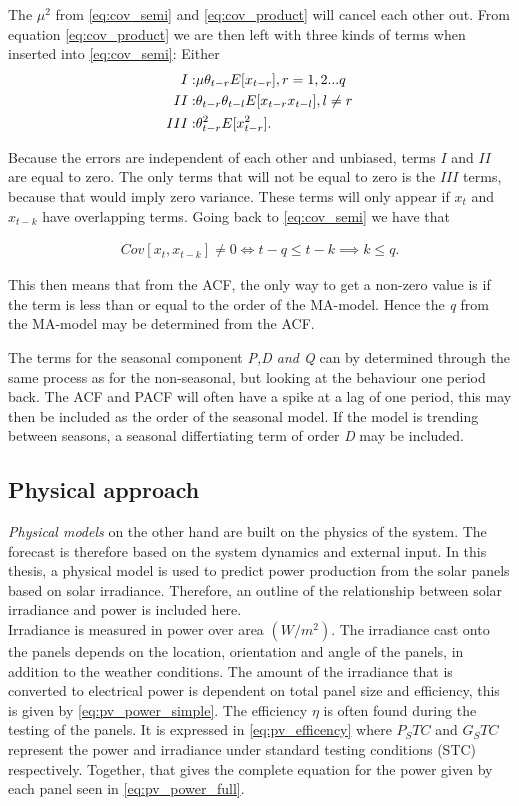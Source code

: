 The $\mu^2$ from \ref{eq:cov_semi} and \ref{eq:cov_product} will cancel each other out. From equation \ref{eq:cov_product} we are then left with three kinds of terms when inserted into \ref{eq:cov_semi}: Either 
\begin{align}
    I: & \mu \theta_{t-r}E[x_{t-r}], r=1,2...q\notag\\
    II:& \theta_{t-r}\theta_{t-l}E[x_{t-r}x_{t-l}], l\neq r\notag\\
    III:& \theta_{t-r}^2E[x_{t-r}^2].
\end{align}

Because the errors are independent of each other and unbiased, terms $I$ and $II$ are equal to zero. The only terms that will not be equal to zero is the $III$ terms, because that would imply zero variance. These terms will only appear if $x_t$ and $x_{t-k}$ have overlapping terms. Going back to \ref{eq:cov_semi} we have that

\begin{align}
    Cov[x_t,x_{t-k}] \neq 0 \iff t-q\leq t-k \implies k\leq q.
\end{align}

This then means that from the ACF, the only way to get a non-zero value is if the term is less than or equal to the order of the MA-model. Hence the \textit{q} from the MA-model may be determined from the ACF.

The terms for the seasonal component \textit{P,D and Q} can by determined through the same process as for the non-seasonal, but looking at the behaviour one period back. The ACF and PACF will often have a spike at a lag of one period, this may then be included as the order of the seasonal model. If the model is trending between seasons, a seasonal differtiating term of order \textit{D} may be included.


\subsection{Physical approach}\label{seq:physical_forecasting}
\textit{Physical models} on the other hand are built on the physics of the system. The forecast is therefore based on the system dynamics and external input. In this thesis, a physical model is used to predict power production from the solar panels based on solar irradiance. Therefore, an outline of the relationship between solar irradiance and power is included here.\\

Irradiance is measured in power over area $(W/m^2)$. The irradiance cast onto the panels depends on the location, orientation and angle of the panels, in addition to the weather conditions. The amount of the irradiance that is converted to electrical power is dependent on total panel size and efficiency, this is given by \ref{eq:pv_power_simple}. The efficiency $\eta$ is often found during the testing of the panels. It is expressed in \ref{eq:pv_efficency} where $P_STC$ and $G_STC$ represent the power and irradiance under standard testing conditions (STC) respectively. Together, that gives the complete equation for the power given by each panel seen in \ref{eq:pv_power_full}. 

